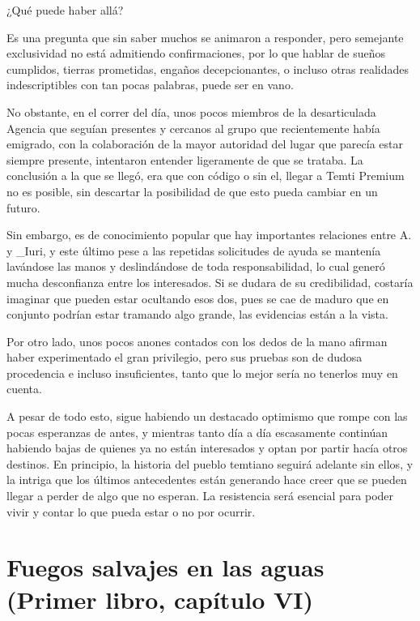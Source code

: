 \documentclass[
  spanish,
]{book}
\begin{document}
¿Qué puede haber allá?

Es una pregunta que sin saber muchos se animaron a responder, pero semejante exclusividad no está admitiendo confirmaciones, por lo que hablar de sueños cumplidos, tierras prometidas, engaños decepcionantes, o incluso otras realidades indescriptibles con tan pocas palabras, puede ser en vano.

No obstante, en el correr del día, unos pocos miembros de la desarticulada Agencia que seguían presentes y cercanos al grupo que recientemente había emigrado, con la colaboración de la mayor autoridad del lugar que parecía estar siempre presente, intentaron entender ligeramente de que se trataba. La conclusión a la que se llegó, era que con código o sin el, llegar a Temti Premium no es posible, sin descartar la posibilidad de que esto pueda cambiar en un futuro.

Sin embargo, es de conocimiento popular que hay importantes relaciones entre A. y \_Iuri, y este último pese a las repetidas solicitudes de ayuda se mantenía lavándose las manos y deslindándose de toda responsabilidad, lo cual generó mucha desconfianza entre los interesados. Si se dudara de su credibilidad, costaría imaginar que pueden estar ocultando esos dos, pues se cae de maduro que en conjunto podrían estar tramando algo grande, las evidencias están a la vista.

Por otro lado, unos pocos anones contados con los dedos de la mano afirman haber experimentado el gran privilegio, pero sus pruebas son de dudosa procedencia e incluso insuficientes, tanto que lo mejor sería no tenerlos muy en cuenta.

A pesar de todo esto, sigue habiendo un destacado optimismo que rompe con las pocas esperanzas de antes, y mientras tanto día a día escasamente continúan habiendo bajas de quienes ya no están interesados y optan por partir hacía otros destinos. En principio, la historia del pueblo temtiano seguirá adelante sin ellos, y la intriga que los últimos antecedentes están generando hace creer que se pueden llegar a perder de algo que no esperan. La resistencia será esencial para poder vivir y contar lo que pueda estar o no por ocurrir.

\hypertarget{fuegos-salvajes-en-las-aguas-primer-libro-capuxedtulo-vi}{%
\section{Fuegos salvajes en las aguas (Primer libro, capítulo VI)}\label{fuegos-salvajes-en-las-aguas-primer-libro-capuxedtulo-vi}}
\end{document}
